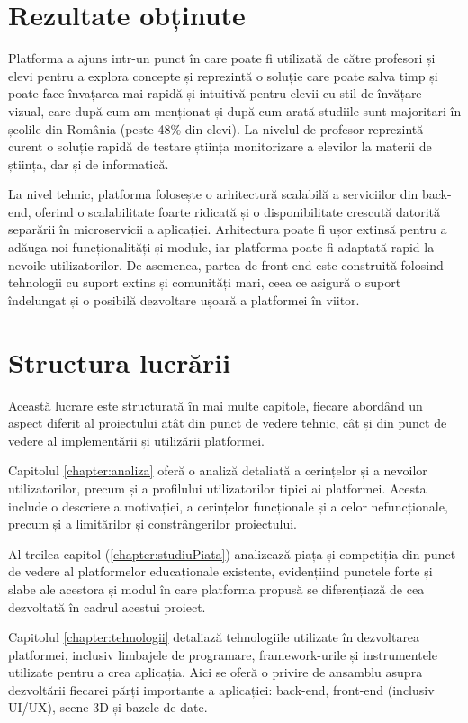 \section{Rezultate obținute}
\label{sec:proj}

Platforma a ajuns intr-un punct în care poate fi utilizată de către profesori și elevi pentru a explora concepte
și reprezintă o soluție care poate salva timp și poate face învațarea mai rapidă și intuitivă pentru elevii
cu stil de învățare vizual, care după cum am menționat și după cum arată studiile sunt majoritari în școlile
din România (peste 48\% din elevi). La nivelul de profesor reprezintă curent o soluție rapidă de testare știința
monitorizare a elevilor la materii de știința, dar și de informatică.

La nivel tehnic, platforma folosește o arhitectură scalabilă a serviciilor din back-end, oferind o scalabilitate
foarte ridicată și o disponibilitate crescută datorită separării în microservicii a aplicației. Arhitectura poate
fi ușor extinsă pentru a adăuga noi funcționalități și module, iar platforma poate fi adaptată rapid la nevoile
utilizatorilor. De asemenea, partea de front-end este construită folosind tehnologii cu suport extins și
comunități mari, ceea ce asigură o suport îndelungat și o posibilă dezvoltare ușoară a platformei în viitor. 

\section{Structura lucrării}
\label{sec:proj}


Această lucrare este structurată în mai multe capitole, fiecare abordând un aspect diferit al proiectului atât din 
punct de vedere tehnic, cât și din punct de vedere al implementării și utilizării platformei.

Capitolul \ref{chapter:analiza} oferă o analiză detaliată a cerințelor și a nevoilor utilizatorilor, precum și a
profilului utilizatorilor tipici ai platformei. Acesta include o descriere a motivației, a cerințelor funcționale și
a celor nefuncționale, precum și a limitărilor și constrângerilor proiectului.

Al treilea capitol (\ref{chapter:studiuPiata}) analizează piața și competiția din punct de vedere al platformelor educaționale
existente, evidențiind punctele forte și slabe ale acestora și modul în care platforma propusă se diferențiază
de cea dezvoltată în cadrul acestui proiect. 

Capitolul \ref{chapter:tehnologii} detaliază tehnologiile utilizate în dezvoltarea platformei, inclusiv limbajele de
programare, framework-urile și instrumentele utilizate pentru a crea aplicația. Aici se oferă o privire de ansamblu 
asupra dezvoltării fiecarei părți importante a aplicației: back-end, front-end (inclusiv UI/UX), scene 3D și bazele de date.


